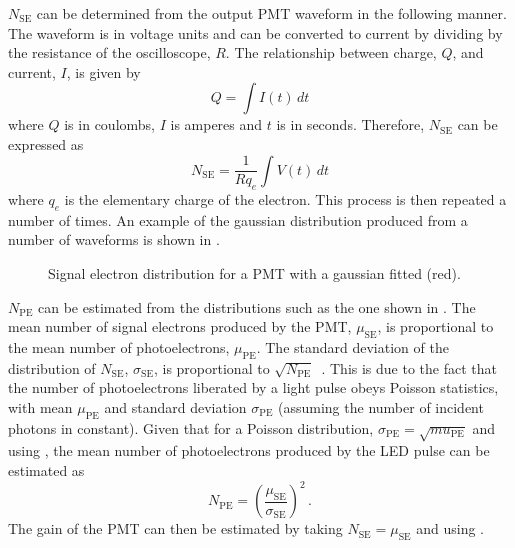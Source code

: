 $N_{\text{SE}}$ can be determined from the output PMT waveform in the following manner.
The waveform is in voltage units and can be converted to current by dividing by the resistance of the oscilloscope, $R$.
The relationship between charge, $Q$, and current, $I$, is given by
\begin{equation}
  Q = \int I(t) \, dt
\end{equation}
where $Q$ is in coulombs, $I$ is amperes and $t$ is in seconds.
Therefore, $N_{\text{SE}}$ can be expressed as
\begin{equation}
  N_{\text{SE}} = \frac{1}{R q_{e}} \int V(t) \, dt
\end{equation}
where $q_{e}$ is the elementary charge of the electron.
This process is then repeated a number of times.
An example of the gaussian distribution produced from a number of waveforms is shown in .

\begin{figure}[h]
  \begin{adjustbox}{max totalsize={.8\textwidth}, center}
    
  \end{adjustbox}
  \caption[Signal electron distribution for a PMT]{Signal electron distribution for a PMT with a gaussian fitted (red).}
  \label{fig:N_se}
\end{figure}

$N_{\text{PE}}$ can be estimated from the distributions such as the one shown in .
The mean number of signal electrons produced by the PMT, $\mu_{\text{SE}}$, is proportional to the mean number of photoelectrons, $\mu_{\text{PE}}$.
The standard deviation of the distribution of $N_{\text{SE}}$, $\sigma_{\text{SE}}$, is proportional to $\sqrt{N_{\text{PE}}}$~\cite{photoelectrons}.
This is due to the fact that the number of photoelectrons liberated by a light pulse obeys Poisson statistics, with mean $\mu_{\text{PE}}$ and standard deviation $\sigma_{\text{PE}}$ (assuming the number of incident photons in constant).
Given that for a Poisson distribution, $\sigma_{\text{PE}} = \sqrt{mu_{\text{PE}}}$ and using , the mean number of photoelectrons produced by the LED pulse can be estimated as
\begin{equation}
  N_{\text{PE}} = \left( \frac{ \mu_{\text{SE}} }{ \sigma_{\text{SE}} }  \right)^{2} \, .
\end{equation}
The gain of the PMT can then be estimated by taking $N_{\text{SE}} = \mu_{\text{SE}}$ and using .

